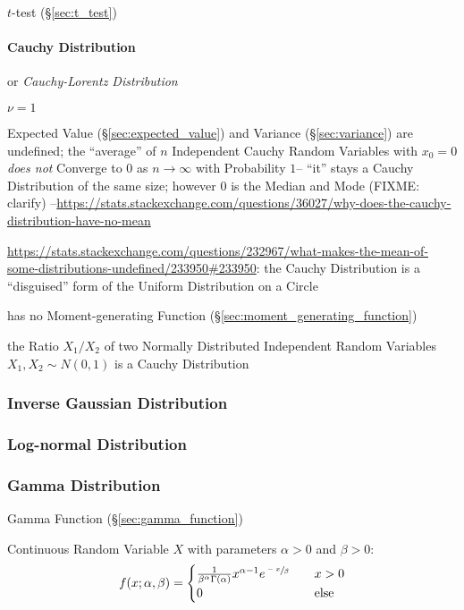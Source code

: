 $t$-test (\S\ref{sec:t_test})



\paragraph{Cauchy Distribution}\label{sec:cauchy_distribution}\hfill

or \emph{Cauchy-Lorentz Distribution}

$\nu = 1$

Expected Value (\S\ref{sec:expected_value}) and Variance (\S\ref{sec:variance})
are undefined; the ``average'' of $n$ Independent Cauchy Random Variables with
$x_0 = 0$ \emph{does not} Converge to $0$ as $n \rightarrow \infty$ with
Probability $1$-- ``it'' stays a Cauchy Distribution of the same size; however
$0$ is the Median and Mode (FIXME: clarify)
--\url{https://stats.stackexchange.com/questions/36027/why-does-the-cauchy-distribution-have-no-mean}

\url{https://stats.stackexchange.com/questions/232967/what-makes-the-mean-of-some-distributions-undefined/233950#233950}:
the Cauchy Distribution is a ``disguised'' form of the Uniform Distribution on a
Circle

has no Moment-generating Function (\S\ref{sec:moment_generating_function})

the Ratio $X_1/X_2$ of two Normally Distributed Independent Random Variables
$X_1, X_2 \sim N(0,1)$ is a Cauchy Distribution



\subsubsection{Inverse Gaussian Distribution}\label{sec:inverse_gaussian}

\subsubsection{Log-normal Distribution}\label{sec:lognormal_distribution}

\subsubsection{Gamma Distribution}\label{sec:gamma_distribution}

Gamma Function (\S\ref{sec:gamma_function})

Continuous Random Variable $X$ with parameters $\alpha > 0$ and $\beta
> 0$:
\[
  f(x; \alpha, \beta) =
  \begin{cases}
    \frac{1}{\beta^\alpha \Gamma(\alpha)} x^{\alpha-1} e^{\sfrac{-x}{\beta}}
      & \quad x > 0 \\
    0 & \quad\text{else} \\
  \end{cases}
\]

